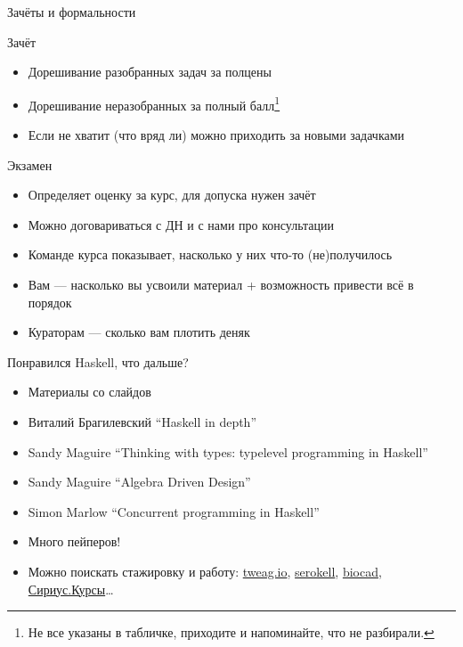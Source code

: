    \begin{frame}[fragile]{Зачёты и формальности}
        \begin{block}{Зачёт}
            \begin{itemize}
                \item Дорешивание разобранных задач за полцены
                \item Дорешивание неразобранных за полный балл\footnote{Не все указаны в табличке, приходите и напоминайте, что не разбирали.}
                \item Если не хватит (что вряд ли) можно приходить за новыми задачками
            \end{itemize}
        \end{block}
        \begin{block}{Экзамен}
            \begin{itemize}
                \item Определяет оценку за курс, для допуска нужен зачёт
                \item Можно договариваться с ДН и с нами про консультации
                \item Команде курса показывает, насколько у них что-то (не)получилось
                \item Вам --- насколько вы усвоили материал + возможность привести всё в порядок
                \item Кураторам --- сколько вам плотить деняк
            \end{itemize}
        \end{block}
    \end{frame}

    \begin{frame}[fragile]{Понравился Haskell, что дальше?}
        \begin{itemize}
            \item Материалы со слайдов
            \item Виталий Брагилевский ``Haskell in depth''
            \item Sandy Maguire ``Thinking with types: typelevel programming in Haskell''
            \item Sandy Maguire ``Algebra Driven Design''
            \item Simon Marlow ``Concurrent programming in Haskell''
            \item Много пейперов!
            \item \pause Можно поискать стажировку и работу: \href{https://www.tweag.io/}{\color{blue}tweag.io}, \href{https://serokell.io/}{\color{blue}serokell}, \href{https://biocad.ru/}{\color{blue}biocad}, \href{https://sirius-courses.ru/}{\color{blue}Сириус.Курсы}\ldots
        \end{itemize}
    \end{frame}

